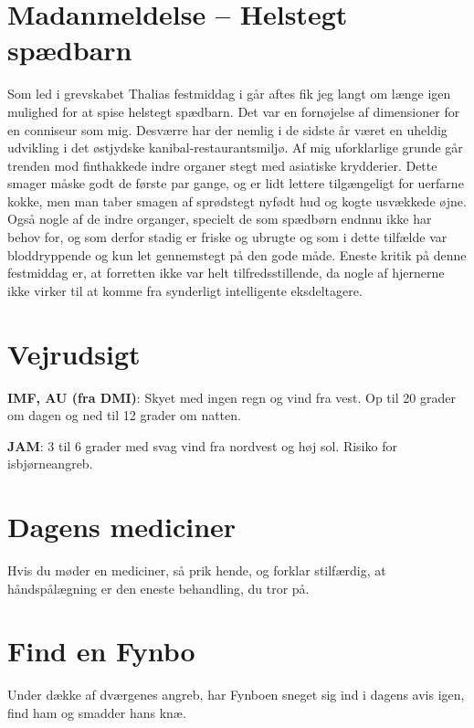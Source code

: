 \begin{minipage}[b]{0.95\linewidth}
\begin{minipage}[t]{0.47\textwidth}
\section*{Madanmeldelse -- Helstegt spædbarn}

\vspace{2mm}
Som led i grevskabet Thalias festmiddag i går aftes fik jeg langt om længe igen mulighed for at spise helstegt spædbarn. Det var en fornøjelse af dimensioner for en conniseur som mig. Desværre har der nemlig i de sidste år været en uheldig udvikling i det østjydske kanibal-restaurantsmiljø. Af mig uforklarlige grunde går trenden mod finthakkede indre organer stegt med asiatiske krydderier. Dette smager måske godt de første par gange, og er lidt lettere tilgængeligt for uerfarne kokke, men man taber smagen af sprødstegt nyfødt hud og kogte usvækkede øjne. Også nogle af de indre organger, specielt de som spædbørn endnnu ikke har behov for, og som derfor stadig er friske og ubrugte og som i dette tilfælde var bloddryppende og kun let gennemstegt på den gode måde. Eneste kritik på denne festmiddag er, at forretten ikke var helt tilfredsstillende, da nogle af hjernerne ikke virker til at komme fra synderligt intelligente eksdeltagere.

\end{minipage}%
\hfill\begin{minipage}[t]{0.47\textwidth}
\vspace{3mm}
\section*{Vejrudsigt}
\textbf{IMF, AU (fra DMI)}: Skyet med ingen regn og vind fra vest. Op til 20 grader om dagen og ned til 12 grader om natten.

\textbf{JAM}: 3 til 6 grader med svag vind fra nordvest og høj sol. Risiko for isbjørneangreb.

\vspace{-2mm}
\section*{Dagens mediciner}
Hvis du møder en mediciner, så prik hende, og forklar stilfærdig, at håndspålægning er den eneste behandling, du tror på.

\vspace{-2mm}
\section*{Find en Fynbo}
Under dække af dværgenes angreb, har Fynboen sneget sig ind i dagens avis igen, find ham og smadder hans knæ.


\end{minipage}
\end{minipage}
